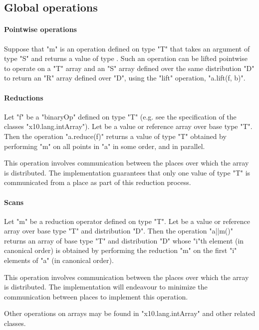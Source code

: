 

\subsection{Global operations }
\paragraph{Pointwise operations}\label{ArrayPointwise}
Suppose that \xcd"m" is an operation defined on type \xcd"T" that
takes an argument of type \xcd"S" and returns a value of type
. Such an operation can be lifted pointwise to operate on a \xcd"T"
array and an \xcd"S" array defined over the same distribution \xcd"D"
to return an \xcd"R" array defined over \xcd"D", using the
\xcd"lift" operation, \xcd"a.lift(f, b)".


\paragraph{Reductions}\label{ArrayReductions}

Let \xcd"f" be a \xcd"binaryOp" defined on type \xcd"T" (e.g.{} see
the specification of the classes \xcd"x10.lang.intArray").  Let
 be a value or reference array over base type \xcd"T". Then the
operation \xcd"a.reduce(f)" returns a value of type \xcd"T" obtained
by performing \xcd"m" on all points in \xcd"a" in some order, and in
parallel.

This operation involves communication between the places over which
the array is distributed. The \Xten{} implementation guarantees that
only one value of type \xcd"T" is communicated from a place as part of
this reduction process.

\paragraph{Scans}\label{ArrayScans}

Let \xcd"m" be a reduction operator defined on type \xcd"T". Let
 be a value or reference array over base type \xcd"T" and
distribution \xcd"D". Then the operation \xcd"a||m()" returns an array
of base type \xcd"T" and distribution \xcd"D" whose \xcd"i"th element
(in canonical order) is obtained by performing the reduction \xcd"m"
on the first \xcd"i" elements of \xcd"a" (in canonical order).

This operation involves communication between the places over which
the array is distributed. The \Xten{} implementation will endeavour to
minimize the communication between places to implement this operation.

Other operations on arrays may be found in \xcd"x10.lang.intArray" and
other related classes.
